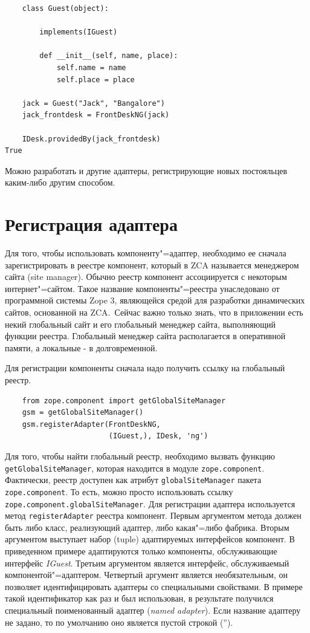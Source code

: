 \documentclass[a4paper,openany,twoside,draft]{book}
\providecommand*{\DUroletitlereference}[1]{\textsl{#1}}
\begin{document}
\begin{verbatim}
    class Guest(object):

        implements(IGuest)

        def __init__(self, name, place):
            self.name = name
            self.place = place

    jack = Guest("Jack", "Bangalore")
    jack_frontdesk = FrontDeskNG(jack)

    IDesk.providedBy(jack_frontdesk)
True
\end{verbatim}

Можно разработать и другие адаптеры, регистрирующие новых
постояльцев каким-либо другим способом.


\section{Регистрация адаптера%
  \label{id35}%
}

Для того, чтобы использовать компоненту"=адаптер, необходимо ее сначала зарегистрировать в реестре компонент, который в ZCA называется менеджером сайта (site manager).  Обычно реестр компонент ассоциируется с некоторым интернет"=сайтом.  Такое название компоненты"=реестра унаследовано от программной системы Zope 3, являющейся средой для разработки динамических сайтов, основанной на ZCA.~Сейчас важно только знать, что в приложении есть некий глобальный сайт и его глобальный менеджер сайта, выполняющий функции реестра.  Глобальный менеджер сайта располагается в оперативной памяти, а локальные - в долговременной.

Для регистрации компоненты сначала надо получить ссылку на глобальный реестр.

\begin{verbatim}
    from zope.component import getGlobalSiteManager
    gsm = getGlobalSiteManager()
    gsm.registerAdapter(FrontDeskNG,
                        (IGuest,), IDesk, 'ng')
\end{verbatim}

Для того, чтобы найти глобальный реестр, необходимо вызвать функцию \texttt{getGlobalSiteManager}, которая находится в модуле \texttt{zope.component}.  Фактически, реестр доступен как атрибут \texttt{globalSiteManager} пакета \texttt{zope.component}.  То есть, можно просто использовать ссылку \texttt{zope.component.globalSiteManager}.  Для регистрации адаптера используется метод \texttt{registerAdapter} реестра компонент.  Первым аргументом метода должен быть либо класс, реализующий адаптер, либо какая"=либо фабрика.  Вторым аргументом выступает набор (tuple) адаптируемых интерфейсов компонент.  В приведенном примере адаптируются только компоненты, обслуживающие интерфейс \DUroletitlereference{IGuest}.  Третьим аргументом является интерфейс, обслуживаемый компонентой"=адаптером.  Четвертый аргумент является необязательным, он позволяет идентифицировать адаптеры со специальными свойствами.  В примере такой идентификатор как раз и был использован, в результате получился специальный поименованный адаптер (\DUroletitlereference{named adapter}).  Если название адаптеру не задано, то по умолчанию оно является пустой строкой ('').
\end{document}
